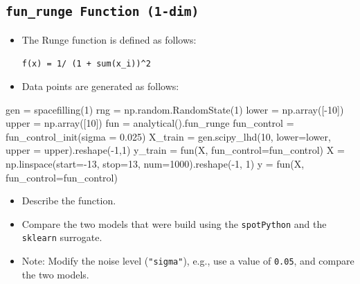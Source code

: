 \documentclass[
  letterpaper,
  DIV=11,
  numbers=noendperiod]{scrreprt}
\newenvironment{Shaded}{\begin{snugshade}}{\end{snugshade}}
\newcommand{\DecValTok}[1]{\textcolor[rgb]{0.68,0.00,0.00}{#1}}
\newcommand{\FloatTok}[1]{\textcolor[rgb]{0.68,0.00,0.00}{#1}}
\newcommand{\NormalTok}[1]{\textcolor[rgb]{0.00,0.23,0.31}{#1}}
\newcommand{\OperatorTok}[1]{\textcolor[rgb]{0.37,0.37,0.37}{#1}}
\providecommand{\tightlist}{%
  \setlength{\itemsep}{0pt}\setlength{\parskip}{0pt}}\usepackage{longtable,booktabs,array}
\begin{document}
\subsection{\texorpdfstring{\texttt{fun\_runge\ Function\ (1-dim)}}{fun\_runge Function (1-dim)}}\label{fun_runge-function-1-dim}

\begin{itemize}
\item
  The Runge function is defined as follows:

  \texttt{f(x)\ =\ 1/\ (1\ +\ sum(x\_i))\^{}2}
\item
  Data points are generated as follows:
\end{itemize}

\begin{Shaded}
\begin{Highlighting}[]
\NormalTok{gen }\OperatorTok{=}\NormalTok{ spacefilling(}\DecValTok{1}\NormalTok{)}
\NormalTok{rng }\OperatorTok{=}\NormalTok{ np.random.RandomState(}\DecValTok{1}\NormalTok{)}
\NormalTok{lower }\OperatorTok{=}\NormalTok{ np.array([}\OperatorTok{{-}}\DecValTok{10}\NormalTok{])}
\NormalTok{upper }\OperatorTok{=}\NormalTok{ np.array([}\DecValTok{10}\NormalTok{])}
\NormalTok{fun }\OperatorTok{=}\NormalTok{ analytical().fun\_runge}
\NormalTok{fun\_control }\OperatorTok{=}\NormalTok{ fun\_control\_init(sigma }\OperatorTok{=} \FloatTok{0.025}\NormalTok{)}
\NormalTok{X\_train }\OperatorTok{=}\NormalTok{ gen.scipy\_lhd(}\DecValTok{10}\NormalTok{, lower}\OperatorTok{=}\NormalTok{lower, upper }\OperatorTok{=}\NormalTok{ upper).reshape(}\OperatorTok{{-}}\DecValTok{1}\NormalTok{,}\DecValTok{1}\NormalTok{)}
\NormalTok{y\_train }\OperatorTok{=}\NormalTok{ fun(X, fun\_control}\OperatorTok{=}\NormalTok{fun\_control)}
\NormalTok{X }\OperatorTok{=}\NormalTok{ np.linspace(start}\OperatorTok{={-}}\DecValTok{13}\NormalTok{, stop}\OperatorTok{=}\DecValTok{13}\NormalTok{, num}\OperatorTok{=}\DecValTok{1000}\NormalTok{).reshape(}\OperatorTok{{-}}\DecValTok{1}\NormalTok{, }\DecValTok{1}\NormalTok{)}
\NormalTok{y }\OperatorTok{=}\NormalTok{ fun(X, fun\_control}\OperatorTok{=}\NormalTok{fun\_control)}
\end{Highlighting}
\end{Shaded}

\begin{itemize}
\tightlist
\item
  Describe the function.
\item
  Compare the two models that were build using the \texttt{spotPython}
  and the \texttt{sklearn} surrogate.
\item
  Note: Modify the noise level (\texttt{"sigma"}), e.g., use a value of
  \texttt{0.05}, and compare the two models.
\end{itemize}
\end{document}
